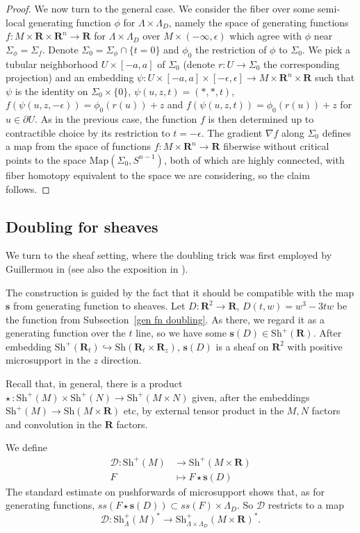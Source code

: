 \documentclass[12pt,a4paper]{article}
\numberwithin{equation}{section}
\theoremstyle{definition}
\theoremstyle{remark}
\newcommand{\R}{\mathbf{R}}
\newcommand{\DD}{\mathcal{D}}
\newcommand{\Map}{\mathrm{Map}}
\newcommand{\del}{\partial}
\newcommand{\s}{\mathbf{s}}
\newcommand{\Sh}{\mathrm{Sh}}
\begin{document}
\begin{proof}
We now turn to the general case. We consider the fiber over some semi-local generating function $\phi$ for $\Lambda\times \Lambda_D$,
namely the space of generating functions $f:M\times \R\times \R^n\to \R$ for $\Lambda\times \Lambda_D$ over $M\times (-\infty, \epsilon)$
which agree with $\phi$ near $\Sigma_\phi=\Sigma_f$. Denote $\Sigma_0=\Sigma_\phi\cap\{t=0\}$ and $\phi_0$ the restriction of $\phi$ to $\Sigma_0$.
We pick a tubular neighborhood $U\times [-a,a]$ of $\Sigma_0$ (denote $r:U\to \Sigma_0$ the corresponding projection) and
an embedding $\psi:U\times[-a,a]\times[-\epsilon,\epsilon]\to M\times \R^n\times \R$ such that
$\psi$ is the identity on $\Sigma_0\times\{0\}$, $\psi(u,z,t)=(*,*,t)$, $f(\psi(u,z,-\epsilon))=\phi_0(r(u))+z$ and $f(\psi(u,z,t))=\phi_0(r(u))+z$ for $u\in \del U$.
As in the previous case, the function $f$ is then determined up to contractible choice by its restriction to $t=-\epsilon$. The gradient $\nabla f$
along $\Sigma_0$ defines a map from the space of functions $f:M\times \R^n\to \R$ fiberwise without critical points to
the space $\Map(\Sigma_0, S^{n-1})$, both of which are highly connected, with fiber homotopy equivalent to the space we are considering, so the claim follows.
\end{proof}


\subsection{Doubling for sheaves} \label{sec: sheaf doubling}
We turn to the sheaf setting, where the doubling trick was first employed by Guillermou in \cite{Guillermou} (see also the exposition in \cite[Sec. 7]{Nadler-Shende}).

The construction is guided by the fact that it should be compatible with the map $\s$ from generating function to sheaves.
Let $D: \R^2 \to \R$, $D(t,w) = w^3-3tw$ be the function from Subsection~\ref{gen fn doubling}. As there, we regard it as a generating function over the $t$ line, so we have some $\s(D) \in \Sh^+(\R)$. After embedding $\Sh^+(\R_t) \hookrightarrow \Sh(\R_t \times \R_z)$, $\s(D)$ is a sheaf on $\R^2$ with positive microsupport in the $z$ direction.

Recall that, in general, there is a product $\star \, : \Sh^+(M) \times \Sh^+(N) \to \Sh^+(M \times N)$ given, after the embeddings $\Sh^+(M) \to \Sh(M \times \R)$ etc, by external tensor product in the $M, N$ factors and convolution in the $\R$ factors.

We define
\begin{align*}
    \DD: \Sh^+(M) & \to \Sh^+(M \times \R) \\
    F & \mapsto F \star \s(D)
\end{align*}
The standard estimate on pushforwards of microsupport shows that, as for generating functions, $ss(F \star \s(D)) \subset ss(F) \times \Lambda_D$.
So $\DD$ restricts to a map
\[\DD:\Sh^+_\Lambda(M)^*\to \Sh^+_{\Lambda\times \Lambda_D}(M\times \R)^*.\]
\end{document}
